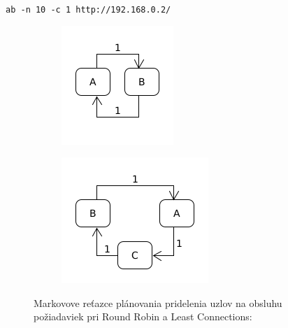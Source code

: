 \documentclass[12pt, a4paper]{article}
\begin{document}
\begin{lrbox}{\shield}
\verb|ab -n 10 -c 1 http://192.168.0.2/|
\end{lrbox}
\begin{figure}[h!]
	\centering
	\begin{subfigure}[t]{.2\textwidth}
  		\centering
  		\includegraphics[width=\textwidth]{images/10-uzly-2.png}
	\end{subfigure}
	\begin{subfigure}[t]{.25\textwidth}
  		\centering
  		\includegraphics[width=\textwidth]{images/10-uzly-3.png}
	\end{subfigure}
	\caption{Markovove reťazce plánovania pridelenia uzlov na obsluhu požiadaviek
	pri Round Robin a Least Connections: \usebox{\shield}}
	\label{markov-ab-10}
\end{figure}
\end{document}
